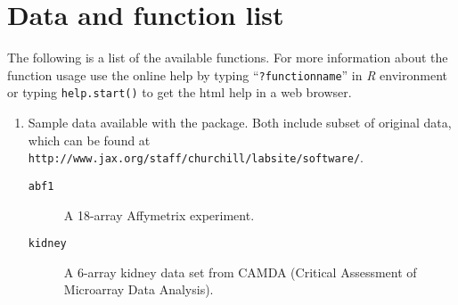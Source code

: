 \section{Data and function list}
The following is a list of the available functions. 
For more information about 
the function usage use the online help by typing ``{\tt ?functionname}''
in {\em R} environment or typing {\tt help.start()} to get the html help in 
a web browser.

\begin{enumerate}
\item Sample data available with the package. Both include subset of original
  data, which can be found at {\tt
http://www.jax.org/staff/churchill/labsite/software/}. 
\begin{description}
\item[{\tt abf1}] A 18-array Affymetrix experiment. 
\item[{\tt kidney}] A 6-array kidney data set from CAMDA (Critical Assessment of Microarray Data Analysis). 
\end{description}


\end{enumerate}
